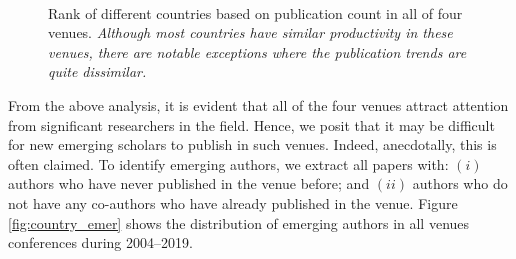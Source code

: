 \begin{figure}[!htbp]
	\centering
	\\
	\caption{Rank of different countries based on publication count in all of four venues. \textit{Although most countries have similar productivity in these venues, there are notable exceptions where the publication trends are quite dissimilar.}}
	\label{fig:country_top}
\end{figure}

From the above analysis, it is evident that all of the four venues attract attention from significant researchers in the field. Hence, we posit that it may be difficult for new emerging scholars to publish in such venues. 
Indeed, anecdotally, this is often claimed.
To identify emerging authors, we extract all papers with: $(i)$ authors who have never published in the venue before; and $(ii)$ authors who do not have any co-authors who have already published in the venue. 
Figure \ref{fig:country_emer} shows the distribution of emerging authors in all venues conferences during 2004--2019.


